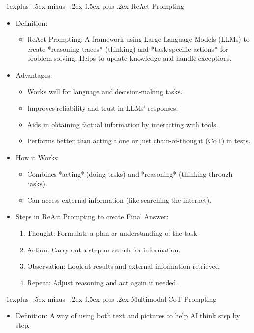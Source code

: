 \documentclass[10pt,landscape]{article}
\makeatletter
\renewcommand{\subsection}{\@startsection{subsection}{2}{0mm}%
                                {-1explus -.5ex minus -.2ex}%
                                {0.5ex plus .2ex}%
                                {\normalfont\normalsize\bfseries}}
\makeatother
\begin{document}
\begin{multicols}{3}
\subsection{ReAct Prompting}
\begin{itemize}
    \item Definition:
    \begin{itemize}
        \item ReAct Prompting: A framework using Large Language Models (LLMs) to create *reasoning traces* (thinking) and *task-specific actions* for problem-solving. Helps to update knowledge and handle exceptions.
    \end{itemize}
    \item Advantages:
    \begin{itemize}
        \item Works well for language and decision-making tasks.
        \item Improves reliability and trust in LLMs' responses.
        \item Aids in obtaining factual information by interacting with tools.
        \item Performs better than acting alone or just chain-of-thought (CoT) in tests.
    \end{itemize}
    \item How it Works:
    \begin{itemize}
        \item Combines *acting* (doing tasks) and *reasoning* (thinking through tasks).
        \item Can access external information (like searching the internet).
    \end{itemize}
    \item Steps in ReAct Prompting to create Final Answer:
    \begin{enumerate}
        \item Thought: Formulate a plan or understanding of the task.
        \item Action: Carry out a step or search for information.
        \item Observation: Look at results and external information retrieved.
        \item Repeat: Adjust reasoning and act again if needed.
    \end{enumerate}
\end{itemize}

\subsection{Multimodal CoT Prompting}
\begin{itemize}
    \item Definition: A way of using both text and pictures to help AI think step by step.
\end{itemize}
\end{multicols}
\end{document}
